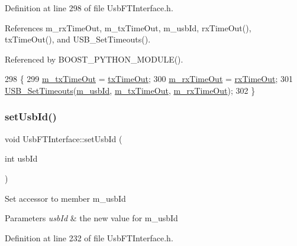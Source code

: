 Definition at line 298 of file Usb\+F\+T\+Interface.\+h.



References m\+\_\+rx\+Time\+Out, m\+\_\+tx\+Time\+Out, m\+\_\+usb\+Id, rx\+Time\+Out(), tx\+Time\+Out(), and U\+S\+B\+\_\+\+Set\+Timeouts().



Referenced by B\+O\+O\+S\+T\+\_\+\+P\+Y\+T\+H\+O\+N\+\_\+\+M\+O\+D\+U\+L\+E().


\begin{DoxyCode}
298                                                 \{
299     \hyperlink{classUsbFTInterface_af88e498a8ed759e35ae9e94f74ffcf56}{m\_txTimeOut} = \hyperlink{classUsbFTInterface_acab2397cb42003a1ed8f69a0c6cae195}{txTimeOut};
300     \hyperlink{classUsbFTInterface_a0153d99857eaa634e4b9fc1ec58caf52}{m\_rxTimeOut} = \hyperlink{classUsbFTInterface_ad95ffb87539ca86882e26fa24b00de97}{rxTimeOut};
301     \hyperlink{LALUsbML_8h_a217702d9c80d1bb65ce8703c0a7382fa}{USB\_SetTimeouts}(\hyperlink{classUsbFTInterface_a91df5c0547e8be460bc087e27afe05aa}{m\_usbId}, \hyperlink{classUsbFTInterface_af88e498a8ed759e35ae9e94f74ffcf56}{m\_txTimeOut}, 
      \hyperlink{classUsbFTInterface_a0153d99857eaa634e4b9fc1ec58caf52}{m\_rxTimeOut});
302   \}
\end{DoxyCode}
\mbox{\label{classUsbFTInterface_a6718c98c2b6d5924b6722e81f93f25f0}} 
\subsubsection{\texorpdfstring{set\+Usb\+Id()}{setUsbId()}}
{\footnotesize\ttfamily void Usb\+F\+T\+Interface\+::set\+Usb\+Id (\begin{DoxyParamCaption}\item[{int}]{usb\+Id }\end{DoxyParamCaption})\hspace{0.3cm}{\ttfamily [inline]}}

Set accessor to member m\+\_\+usb\+Id 
\begin{DoxyParams}{Parameters}
{\em usb\+Id} & the new value for m\+\_\+usb\+Id \\
\hline
\end{DoxyParams}


Definition at line 232 of file Usb\+F\+T\+Interface.\+h.



